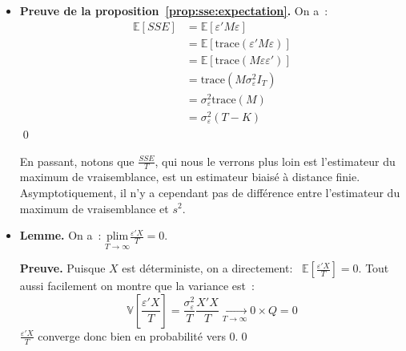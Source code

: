 \documentclass[10pt,a4paper]{article}
\theoremstyle{definition}
\renewcommand{\newline}{\unskip\par\vspace{1.5pt}}
\begin{document}
\begin{notes}
  \begin{itemize}

  \item \textbf{Preuve de la proposition~\ref{prop:sse:expectation}.} On a~:
    \[
      \begin{split}
        \mathbb E[SSE] &= \mathbb E [\varepsilon' M \varepsilon]\\
                       &= \mathbb E \left[\mathrm{trace}\left( \varepsilon' M \varepsilon \right)\right]\\
                       &= \mathbb E \left[\mathrm{trace}\left( M \varepsilon\varepsilon'  \right)\right]\\
                       &= \mathrm{trace}\left( M \sigma_{\varepsilon}^2 I_T  \right)\\
                       &= \sigma_{\varepsilon}^2\mathrm{trace}\left( M\right)\\
                       &= \sigma_{\varepsilon}^2(T-K)
      \end{split}
    \]
\qed

\medskip

En passant, notons que $\frac{SSE}{T}$, qui nous le verrons plus loin est l'estimateur du maximum de vraisemblance, est un estimateur biaisé à distance finie. Asymptotiquement, il n'y a cependant pas de différence entre l'estimateur du maximum de vraisemblance et $s^2$.\newline

\medskip
\item \textbf{Lemme.} On a~: $\underset{T\to\infty}{\mathrm{plim}} \frac{\varepsilon'X}{T} = 0$.\newline\newline

  \textbf{Preuve.} Puisque $X$ est déterministe, on a directement:~ $\mathbb E \left[ \frac{\varepsilon'X}{T} \right] = 0$. Tout aussi facilement on montre que la variance est~:
  \[
    \mathbb V \left[ \frac{\varepsilon'X}{T} \right] = \frac{\sigma_{\varepsilon}^2}{T}\frac{X'X}{T}\underset{T\to\infty}{\longrightarrow} 0 \times Q=0
  \]
$\frac{\varepsilon 'X}{T}$ converge donc bien en probabilité vers 0.\qed



\end{itemize}
\end{notes}
\end{document}
